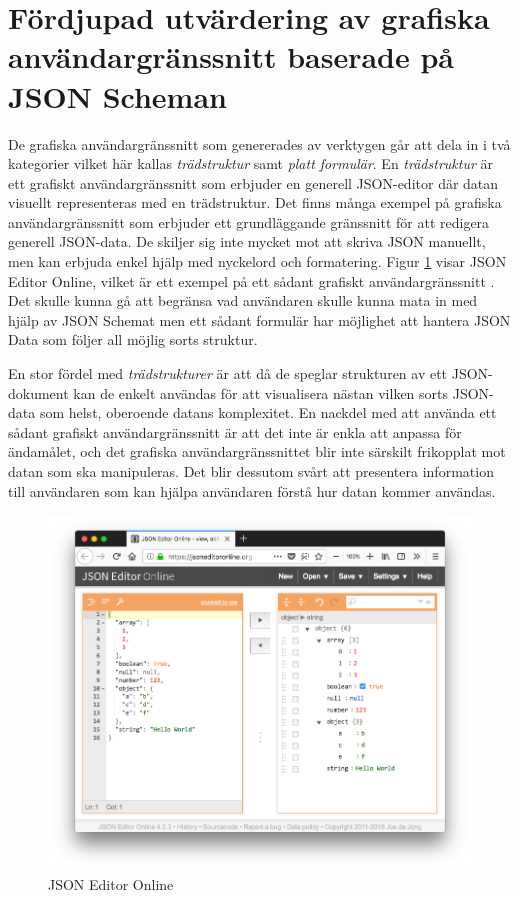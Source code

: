 \section{Fördjupad utvärdering av grafiska användargränssnitt baserade på JSON Scheman}
\label{sec:forarbete:kategorisering}

De grafiska användargränssnitt som genererades av verktygen går att dela in i två kategorier vilket här kallas \textit{trädstruktur} samt \textit{platt formulär}. En \textit{trädstruktur} är ett grafiskt användargränssnitt som erbjuder en generell JSON-editor där datan visuellt representeras med en trädstruktur. Det finns många exempel på grafiska användargränssnitt som erbjuder ett grundläggande gränssnitt för att redigera generell JSON-data. De skiljer sig inte mycket mot att skriva JSON manuellt, men kan erbjuda enkel hjälp med nyckelord och formatering. Figur \ref{fig:json-editor} visar JSON Editor Online, vilket är ett exempel på ett sådant grafiskt användargränssnitt \cite{DeJong2018}. Det skulle kunna gå att begränsa vad användaren skulle kunna mata in med hjälp av JSON Schemat men ett sådant formulär har möjlighet att hantera JSON Data som följer all möjlig sorts struktur.

En stor fördel med \textit{trädstrukturer} är att då de speglar strukturen av ett JSON-dokument kan de enkelt användas för att visualisera nästan vilken sorts JSON-data som helst, oberoende datans komplexitet. En nackdel med att använda ett sådant grafiskt användargränssnitt är att det inte är enkla att anpassa för ändamålet, och det grafiska användargränssnittet blir inte särskilt frikopplat mot datan som ska manipuleras. Det blir dessutom svårt att presentera information till användaren som kan hjälpa användaren förstå hur datan kommer användas.

\begin{figure}
	\includegraphics[width=\textwidth]{./images/screenshot-json-editor.png}
	\vspace{-1.7em}
	\caption{JSON Editor Online \cite{DeJong2018}}
	\label{fig:json-editor}
\end{figure}

